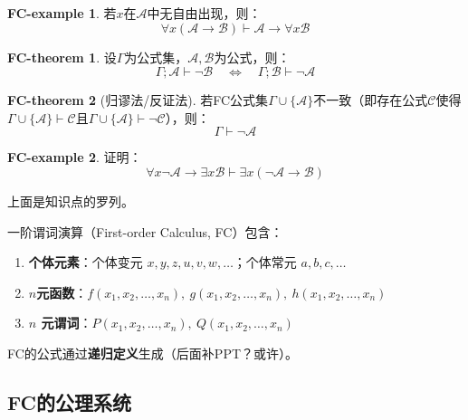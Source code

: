 \documentclass[oneside]{book}
\theoremstyle{definition}
\newtheorem{fct}{FC-theorem}
\newtheorem{fce}{FC-example}
\begin{document}
\begin{fce}
	若\( x \)在\( \mathcal{A} \)中无自由出现，则：
	\[
	\forall x (\mathcal{A} \to \mathcal{B}) \vdash \mathcal{A} \to \forall x \mathcal{B}
	\]
\end{fce}
\begin{fct}
	设\( \Gamma \)为公式集，\( \mathcal{A}, \mathcal{B} \)为公式，则：
	\[
	\Gamma; \mathcal{A} \vdash \neg\mathcal{B} \quad \iff \quad \Gamma; \mathcal{B} \vdash \neg \mathcal{A}
	\]
\end{fct}
\begin{fct}[归谬法/反证法]
	若FC公式集\( \Gamma \cup \{ \mathcal{A} \} \)不一致（即存在公式\( \mathcal{C} \)使得\( \Gamma \cup \{ \mathcal{A} \} \vdash \mathcal{C} \)且\( \Gamma \cup \{ \mathcal{A} \} \vdash \neg \mathcal{C} \)），则：
	\[
	\Gamma \vdash \neg \mathcal{A}
	\]
\end{fct}
\begin{fce}
	证明：
	\[
	\forall x \neg \mathcal{A} \to \exists x \mathcal{B} \vdash \exists x (\neg \mathcal{A} \to \mathcal{B})
	\]
\end{fce}

上面是知识点的罗列。

一阶谓词演算（First-order Calculus, FC）包含：
\begin{enumerate}
	\item \textbf{个体元素}：个体变元 \( x,y,z,u,v,w,\dots \)；个体常元 \( a,b,c,\dots \)
	\item \textbf{\( n \)元函数}：\( f(x_1,x_2,\dots,x_n),\ g(x_1,x_2,\dots,x_n),\ h(x_1,x_2,\dots,x_n) \)
	\item \textbf{\(n\) 元谓词}：\( P(x_1,x_2,\dots,x_n),\ Q(x_1,x_2,\dots,x_n) \)
\end{enumerate}
FC的公式通过\textbf{递归定义}生成（后面补PPT？或许）。






\subsection{FC的公理系统}
\end{document}

